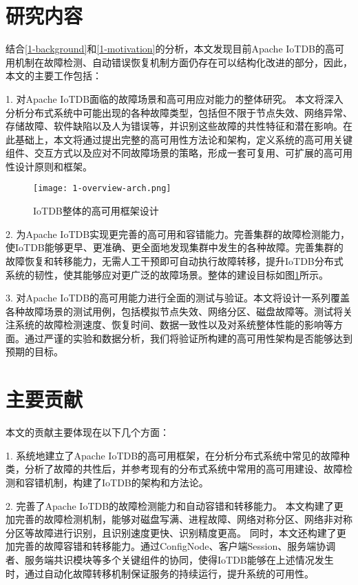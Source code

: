 \section{研究内容}

结合\ref{1-background}和\ref{1-motivation}的分析，本文发现目前Apache IoTDB的高可用机制在故障检测、自动错误恢复机制方面仍存在可以结构化改进的部分，因此，本文的主要工作包括：

1. 对Apache IoTDB面临的故障场景和高可用应对能力的整体研究。
本文将深入分析分布式系统中可能出现的各种故障类型，包括但不限于节点失效、网络异常、存储故障、软件缺陷以及人为错误等，并识别这些故障的共性特征和潜在影响。在此基础上，本文将通过提出完整的高可用性方法论和架构，定义系统的高可用关键组件、交互方式以及应对不同故障场景的策略，形成一套可复用、可扩展的高可用性设计原则和框架。


\begin{figure}
  \centering
  \texttt{[image: 1-overview-arch.png]}
  \caption{IoTDB整体的高可用框架设计}
  \label{fig:c01-overview-arch}
\end{figure}

2. 为Apache IoTDB实现更完善的高可用和容错能力。完善集群的故障检测能力，使IoTDB能够更早、更准确、更全面地发现集群中发生的各种故障。完善集群的故障恢复和转移能力，无需人工干预即可自动执行故障转移，提升IoTDB分布式系统的韧性，使其能够应对更广泛的故障场景。整体的建设目标如图\ref{fig:c01-overview-arch}所示。


3. 对Apache IoTDB的高可用能力进行全面的测试与验证。本文将设计一系列覆盖各种故障场景的测试用例，包括模拟节点失效、网络分区、磁盘故障等。测试将关注系统的故障检测速度、恢复时间、数据一致性以及对系统整体性能的影响等方面。通过严谨的实验和数据分析，我们将验证所构建的高可用性架构是否能够达到预期的目标。



\section{主要贡献}

本文的贡献主要体现在以下几个方面：

1. 系统地建立了Apache IoTDB的高可用框架，在分析分布式系统中常见的故障种类，分析了故障的共性后，并参考现有的分布式系统中常用的高可用建设、故障检测和容错机制，构建了IoTDB的架构和方法论。



2. 完善了Apache IoTDB的故障检测能力和自动容错和转移能力。
本文构建了更加完善的故障检测机制，能够对磁盘写满、进程故障、网络对称分区、网络非对称分区等故障进行识别，且识别速度更快、识别精度更高。
同时，本文还构建了更加完善的故障容错和转移能力。通过ConfigNode、客户端Session、服务端协调者、服务端共识模块等多个关键组件的协同，使得IoTDB能够在上述情况发生时，通过自动化故障转移机制保证服务的持续运行，提升系统的可用性。


